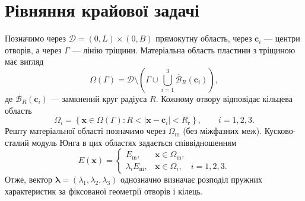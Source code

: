 \section{Рівняння крайової задачі}
\label{sec:problem-elasticity}
Позначимо через $\mathcal D=(0,L)\times(0,B)$ прямокутну область, через $\boldsymbol c_i$ --- центри отворів, а через $\Gamma$ --- лінію тріщини. Матеріальна область пластини з тріщиною має вигляд
\begin{equation}
 \Omega(\Gamma)=
 \mathcal D\setminus
 \left(\Gamma\cup\bigcup_{i=1}^{3}
 \overline{\mathcal B}_{R}(\boldsymbol c_i)\right),
 \label{eq:problem-domain}
\end{equation}
де $\overline{\mathcal B}_{R}(\boldsymbol c_i)$ --- замкнений круг радіуса $R$. Кожному отвору відповідає кільцева область
\begin{equation}
 \Omega_i=\left\{\boldsymbol x\in\Omega(\Gamma):
 R<|\boldsymbol x-\boldsymbol c_i|<R_{\mathrm r}\right\},
 \qquad i=1,2,3.
\end{equation}
Решту матеріальної області позначимо через $\Omega_{\mathrm m}$ (без міжфазних меж). Кусково-сталий модуль Юнга в цих областях задається співвідношенням
\begin{equation}
 E(\boldsymbol x)=
 \begin{cases}
 E_{\mathrm m}, & \boldsymbol x\in\Omega_{\mathrm m},\\
 \lambda_i E_{\mathrm m}, & \boldsymbol x\in\Omega_i,\quad i=1,2,3.
 \end{cases}
 \label{eq:problem-modulus}
\end{equation}
Отже, вектор $\boldsymbol\lambda=(\lambda_1,\lambda_2,\lambda_3)$ однозначно визначає розподіл пружних характеристик за фіксованої геометрії отворів і кілець.

